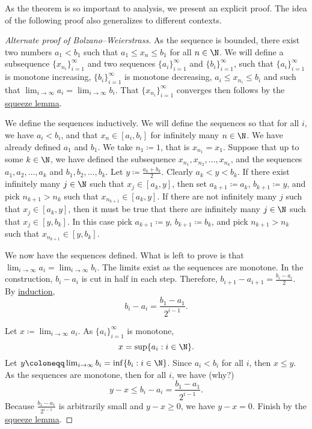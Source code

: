 As the theorem is so important to analysis, we present an explicit
proof.
The idea of the following proof also generalizes to different contexts.

\begin{proof}[Alternate proof of Bolzano--Weierstrass]
As the sequence is bounded, there exist two numbers $a_1 < b_1$
such that $a_1 \leq x_n \leq b_1$ for all $n \in \N$.
We will define a subsequence $\{ x_{n_i} \}_{i=1}^\infty$ and two
sequences $\{ a_i \}_{i=1}^\infty$ and $\{ b_i \}_{i=1}^\infty$, such that
$\{ a_i \}_{i=1}^\infty$ is monotone increasing, $\{ b_i \}_{i=1}^\infty$ is monotone decreasing,
$a_i \leq x_{n_i} \leq b_i$ and such that $\lim_{i\to\infty} a_i =
\lim_{i\to\infty} b_i$.   That
$\{ x_{n_i} \}_{i=1}^\infty$ converges then follows by the \hyperref[squeeze:lemma]{squeeze lemma}.

We define the sequences inductively.  We will define the sequences so that
for all $i$, we have $a_i < b_i$,
and that $x_n \in [a_i,b_i]$ for infinitely many $n \in \N$.
We have already defined $a_1$ and $b_1$.  We take $n_1 \coloneqq 1$, that is
$x_{n_1} = x_1$.
Suppose that up to some $k \in \N$,
we have defined the subsequence $x_{n_1}, x_{n_2}, \ldots,
x_{n_k}$, and the sequences $a_1,a_2,\ldots,a_k$
and $b_1,b_2,\ldots,b_k$.
Let $y \coloneqq \frac{a_k+b_k}{2}$.
Clearly
$a_k < y < b_k$.  If there exist infinitely many $j \in \N$
such that $x_j \in [a_k,y]$, then set $a_{k+1} \coloneqq a_k$, $b_{k+1}
\coloneqq y$,
and pick $n_{k+1} > n_{k}$
such that $x_{n_{k+1}} \in [a_k,y]$.  If there are not infinitely many 
$j$ such that 
$x_j \in [a_k,y]$, then it must be true that there are infinitely many $j \in
\N$ such that 
$x_j \in [y,b_k]$.  In this case pick $a_{k+1} \coloneqq y$, $b_{k+1}
\coloneqq b_k$,
and pick $n_{k+1} > n_{k}$
such that $x_{n_{k+1}} \in [y,b_k]$.

We now have the sequences defined.  What is left to prove is that
$\lim_{i\to\infty} a_i = \lim_{i\to\infty} b_i$.  The limits exist as the sequences
are monotone.  In the construction,
$b_i - a_i$ is cut in half in each step.  Therefore,
$b_{i+1} - a_{i+1} = \frac{b_i-a_i}{2}$.  By
\hyperref[induction:thm]{induction},
\begin{equation*}
b_i - a_i = \frac{b_1-a_1}{2^{i-1}} .
\end{equation*}

Let $x \coloneqq \lim_{i\to\infty} a_i$.  As $\{ a_i \}_{i=1}^\infty$ is monotone,
\begin{equation*}
x = \sup \{ a_i : i \in \N \} .
\end{equation*}
Let $y \coloneqq \lim_{i\to\infty} b_i = \inf \{ b_i : i \in \N \}$.  Since $a_i < b_i$ for
all $i$, then $x \leq y$.
As the sequences are monotone, then
for all $i$, we have (why?)
\begin{equation*}
y-x \leq b_i-a_i = \frac{b_1-a_1}{2^{i-1}} .
\end{equation*}
Because $\frac{b_1-a_1}{2^{i-1}}$ is arbitrarily small and $y-x \geq 0$,
we have $y-x = 0$.  Finish by the \hyperref[squeeze:lemma]{squeeze lemma}.
\end{proof}

